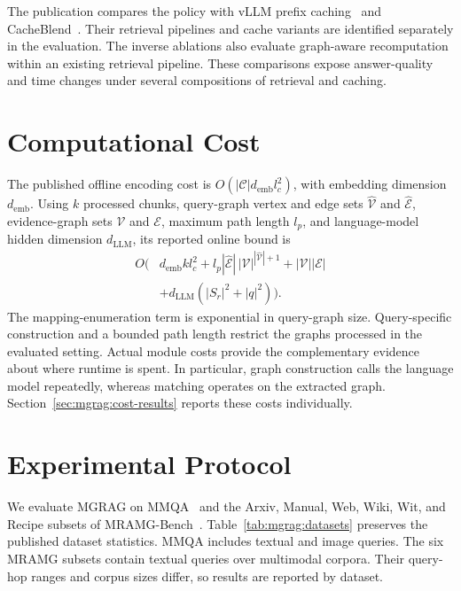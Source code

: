 The publication compares the policy with vLLM prefix caching~\cite{mgrag-kwon2023efficient} and CacheBlend~\cite{mgrag-yao2025cacheblend}. Their retrieval pipelines and cache variants are identified separately in the evaluation. The inverse ablations also evaluate graph-aware recomputation within an existing retrieval pipeline. These comparisons expose answer-quality and time changes under several compositions of retrieval and caching.

\section{Computational Cost}
\label{sec:mgrag:complexity}

The published offline encoding cost is $O(|\mathcal C|d_{\mathrm{emb}}l_c^2)$, with embedding dimension $d_{\mathrm{emb}}$. Using $k$ processed chunks, query-graph vertex and edge sets $\widehat{\mathcal V}$ and $\widehat{\mathcal E}$, evidence-graph sets $\mathcal V$ and $\mathcal E$, maximum path length $l_p$, and language-model hidden dimension $d_{\mathrm{LLM}}$, its reported online bound is
\begin{equation}
\begin{split}
 O\bigl(&d_{\mathrm{emb}}kl_c^2
 +l_p|\widehat{\mathcal E}|\,|\mathcal V|^{|\widehat{\mathcal V}|+1}
 +|\mathcal V||\mathcal E|\\
 &+d_{\mathrm{LLM}}(|S_r|^2+|q|^2)\bigr).
\end{split}
\label{eq:mgrag:complexity}
\end{equation}
The mapping-enumeration term is exponential in query-graph size. Query-specific construction and a bounded path length restrict the graphs processed in the evaluated setting. Actual module costs provide the complementary evidence about where runtime is spent. In particular, graph construction calls the language model repeatedly, whereas matching operates on the extracted graph. Section~\ref{sec:mgrag:cost-results} reports these costs individually.

\section{Experimental Protocol}
\label{sec:mgrag:protocol}

We evaluate MGRAG on MMQA~\cite{mgrag-talmor2021multimodalqa} and the Arxiv, Manual, Web, Wiki, Wit, and Recipe subsets of MRAMG-Bench~\cite{mgrag-yu2025mramg}. Table~\ref{tab:mgrag:datasets} preserves the published dataset statistics. MMQA includes textual and image queries. The six MRAMG subsets contain textual queries over multimodal corpora. Their query-hop ranges and corpus sizes differ, so results are reported by dataset.

